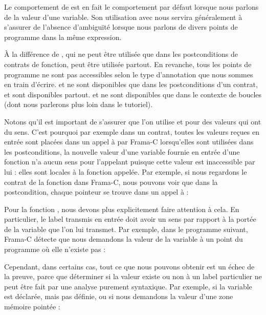 \begin{Information}
Le comportement de  est en fait le comportement par défaut lorsque
nous parlons de la valeur d'une variable. Son utilisation avec  nous
servira généralement à s'assurer de l'absence d’ambiguïté lorsque nous parlons
de divers points de programme dans la même expression.
\end{Information}


À la différence de , qui ne peut être utilisée que dans les
postconditions de contrats de fonction,  peut être utilisée partout.
En revanche, tous les points de programme ne sont pas accessibles selon le type
d'annotation que nous sommes en train d'écrire.  et  ne sont
disponibles que dans les postconditions d'un contrat,  et 
sont disponibles partout.  et  ne sont
disponibles que dans le contexte de boucles (dont nous parlerons plus loin dans
le tutoriel).


Notons qu'il est important de s'assurer que l'on utilise  et
 pour des valeurs qui ont du sens. C'est pourquoi par
exemple dans un contrat, toutes les valeurs reçues en entrée sont placées dans un
appel à  par Frama-C lorsqu'elles sont utilisées dans
les postconditions, la nouvelle valeur d'une variable fournie en entrée d'une
fonction n'a aucun sens pour l'appelant puisque cette valeur est inaccessible par
lui : elles sont locales à la fonction appelée. Par exemple, si nous regardons le
contrat de la fonction  dans Frama-C, nous pouvons voir que dans
la postcondition, chaque pointeur se trouve dans un appel à  :




Pour la fonction , nous devons plus
explicitement faire attention à cela. En particulier, le label transmis en entrée
doit avoir un sens par rapport à la portée de la variable que l'on lui transmet.
Par exemple, dans le programme suivant, Frama-C détecte que nous demandons la valeur
de la variable  à un point du programme où elle n'existe pas :






Cependant, dans certains cas, tout ce que nous pouvons obtenir est un échec de
la preuve, parce que déterminer si la valeur existe ou non à un label particulier
ne peut être fait par une analyse purement syntaxique. Par exemple, si la variable
est déclarée, mais pas définie, ou si nous demandons la valeur d'une zone mémoire
pointée :


